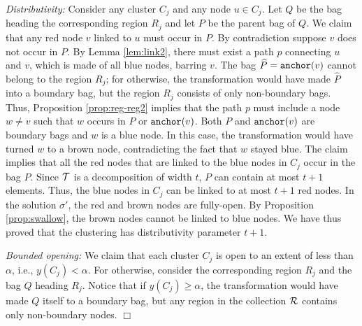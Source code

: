 \documentclass[11pt]{article}
\newcommand{\anc} {{\tt anchor}}
\newcommand{\wh}[1] {\widehat{#1}}
\newcommand{\calT} {{\cal T}}
\newcommand{\calR} {{\cal R}}
\newcommand{\qed} {\hfill$\Box$}
\begin{document}
{\it Distributivity: }
Consider any cluster $C_j$ and any node $u\in C_j$. 
Let $Q$ be the bag heading the corresponding region $R_j$ and let $P$ be the parent bag of $Q$.
We claim that any red node $v$ linked to $u$ must occur in $P$.
By contradiction suppose $v$ does not occur in $P$.
By Lemma \ref{lem:link2}, there must exist a path $p$ connecting $u$ and $v$,
which is made of all blue nodes, barring $v$.
The bag $\wh{P}=\anc(v)$ cannot belong to the region $R_j$; 
for otherwise, the transformation would have made $\wh{P}$ into a boundary bag,
but the region $R_j$ consists of only non-boundary bags.
Thus, Proposition \ref{prop:reg-reg2} implies that the path $p$ must include a node $w\neq v$ such that $w$ occurs in $P$ or $\anc(v)$.
Both $P$ and $\anc(v)$ are boundary bags and $w$ is a blue node.
In this case, the transformation would have turned $w$ to a brown node,
contradicting the fact that $w$ stayed blue.
The claim implies that all the red nodes that are linked to the blue nodes in $C_j$ occur in the bag $P$.
Since $\calT$ is a decomposition of width $t$, $P$ can contain at most $t+1$ elements.
Thus, the blue nodes in $C_j$ can be linked to at most $t+1$ red nodes.
In the solution $\sigma'$, the red and brown nodes are fully-open. 
By Proposition \ref{prop:swallow}, the brown nodes cannot be linked to blue nodes.
We have thus proved that the clustering has distributivity parameter $t+1$.

{\it Bounded opening: }
We claim that each cluster $C_j$ is open to an extent of less than $\alpha$, i.e., $y(C_j) < \alpha$.
For otherwise, consider the corresponding region $R_j$ and the bag $Q$ heading $R_j$.
Notice that if $y(C_j) \geq \alpha$, the transformation would have made $Q$ itself to a boundary bag,
but any region in the collection $\calR$ contains only non-boundary nodes.
\qed
\end{document}
